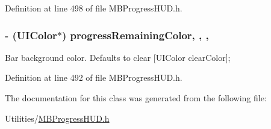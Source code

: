Definition at line 498 of file M\+B\+Progress\+H\+U\+D.\+h.

\hypertarget{interface_m_b_bar_progress_view_a0529e715ce6e40bf0e09864ba0ca1219}{
\subsubsection[{progress\+Remaining\+Color}]{\setlength{\rightskip}{0pt plus 5cm}-\/ (U\+I\+Color$\ast$) progress\+Remaining\+Color\hspace{0.3cm}{\ttfamily [read]}, {\ttfamily [write]}, {\ttfamily [nonatomic]}, {\ttfamily [assign]}}}\label{interface_m_b_bar_progress_view_a0529e715ce6e40bf0e09864ba0ca1219}
Bar background color. Defaults to clear \mbox{[}U\+I\+Color clear\+Color\mbox{]}; 

Definition at line 492 of file M\+B\+Progress\+H\+U\+D.\+h.



The documentation for this class was generated from the following file\+:\begin{DoxyCompactItemize}
\item 
Utilities/\hyperlink{_m_b_progress_h_u_d_8h}{M\+B\+Progress\+H\+U\+D.\+h}\end{DoxyCompactItemize}

